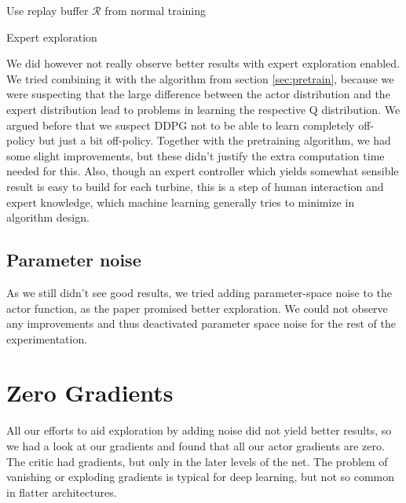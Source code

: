 \documentclass[hyperref,beleg]{cgvpub}
\begin{document}
\begin{algorithm}
\SetAlgoLined
Use replay buffer $\mathcal{R}$ from normal training\\

\caption{Expert exploration}
\label{alg:expertexplo}
\end{algorithm}

We did however not really observe better results with expert exploration enabled. We tried combining it with the algorithm from section \ref{sec:pretrain}, because we were suspecting that the large difference between the actor distribution and the expert distribution lead to problems in learning the respective Q distribution. We argued before that we suspect DDPG not to be able to learn completely off-policy but just a bit off-policy. Together with the pretraining algorithm, we had some slight improvements, but these didn't justify the extra computation time needed for this. Also, though an expert controller which yields somewhat sensible result is easy to build for each turbine, this is a step of human interaction and expert knowledge, which machine learning generally tries to minimize in algorithm design.

\subsection{Parameter noise}

As we still didn't see good results, we tried adding parameter-space noise \cite{plappertParameterSpaceNoise2017} to the actor function, as the paper promised better exploration. We could not observe any improvements and thus deactivated parameter space noise for the rest of the experimentation.

\section{Zero Gradients}
All our efforts to aid exploration by adding noise did not yield better results, so we had a look at our gradients and found that all our actor gradients are zero. The critic had gradients, but only in the later levels of the net. The problem of vanishing or exploding gradients is typical for deep learning, but not so common in flatter architectures.
\end{document}
